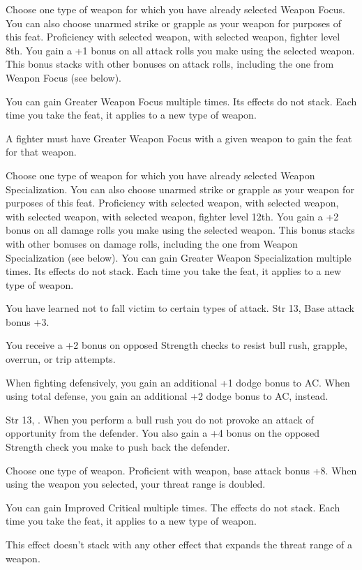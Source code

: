 {Choose one type of weapon for which you have already selected Weapon Focus. You can also choose unarmed strike or grapple as your weapon for purposes of this feat.}
{Proficiency with selected weapon,  with selected weapon, fighter level 8th.}
{You gain a +1 bonus on all attack rolls you make using the selected weapon. This bonus stacks with other bonuses on attack rolls, including the one from Weapon Focus (see below).}{}
{You can gain Greater Weapon Focus multiple times. Its effects do not stack. Each time you take the feat, it applies to a new type of weapon.

A fighter must have Greater Weapon Focus with a given weapon to gain the  feat for that weapon.}

{Choose one type of weapon for which you have already selected Weapon Specialization. You can also choose unarmed strike or grapple as your weapon for purposes of this feat.}
{Proficiency with selected weapon,  with selected weapon,  with selected weapon,  with selected weapon, fighter level 12th.}
{You gain a +2 bonus on all damage rolls you make using the selected weapon. This bonus stacks with other bonuses on damage rolls, including the one from Weapon Specialization (see below).}{}
{You can gain Greater Weapon Specialization multiple times. Its effects do not stack. Each time you take the feat, it applies to a new type of weapon.}

{You have learned not to fall victim to certain types of attack.}
{Str 13, Base attack bonus +3.}
{You receive a +2 bonus on opposed Strength checks to resist bull rush, grapple, overrun, or trip attempts.

When fighting defensively, you gain an additional +1 dodge bonus to AC. When using total defense, you gain an additional +2 dodge bonus to AC, instead.}{}{}

{}
{Str 13, .}
{When you perform a bull rush you do not provoke an attack of opportunity from the defender. You also gain a +4 bonus on the opposed Strength check you make to push back the defender.}{}{}

{Choose one type of weapon.}
{Proficient with weapon, base attack bonus +8.}
{When using the weapon you selected, your threat range is doubled.}{}
{You can gain Improved Critical multiple times. The effects do not stack. Each time you take the feat, it applies to a new type of weapon.

This effect doesn't stack with any other effect that expands the threat range of a weapon.}{}

